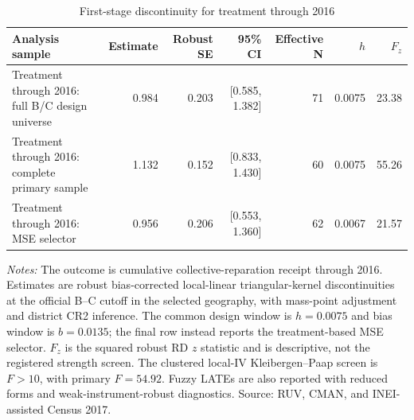 \begin{table}[!htbp]
\centering
\small
\caption{First-stage discontinuity for treatment through 2016}
\label{tab:rd_outcomes_first_stage_2017_ccpp}
\begin{tabular}{lrrrrrr}
\toprule
Analysis sample & Estimate & Robust SE & 95\% CI & Effective N & \(h\) & \(F_z\) \\
\midrule
Treatment through 2016: full B/C design universe & 0.984 & 0.203 & [0.585, 1.382] & 71 & 0.0075 & 23.38 \\
Treatment through 2016: complete primary sample & 1.132 & 0.152 & [0.833, 1.430] & 60 & 0.0075 & 55.26 \\
Treatment through 2016: MSE selector & 0.956 & 0.206 & [0.553, 1.360] & 62 & 0.0067 & 21.57 \\
\bottomrule
\end{tabular}
\parbox{0.97\linewidth}{\footnotesize \textit{Notes:} The outcome is cumulative collective-reparation receipt through 2016. Estimates are robust bias-corrected local-linear triangular-kernel discontinuities at the official B--C cutoff in the selected geography, with mass-point adjustment and district CR2 inference. The common design window is \(h=0.0075\) and bias window is \(b=0.0135\); the final row instead reports the treatment-based MSE selector. \(F_z\) is the squared robust RD \(z\) statistic and is descriptive, not the registered strength screen. The clustered local-IV Kleibergen--Paap screen is \(F>10\), with primary \(F=54.92\). Fuzzy LATEs are also reported with reduced forms and weak-instrument-robust diagnostics. Source: RUV, CMAN, and INEI-assisted Census 2017.}
\end{table}
